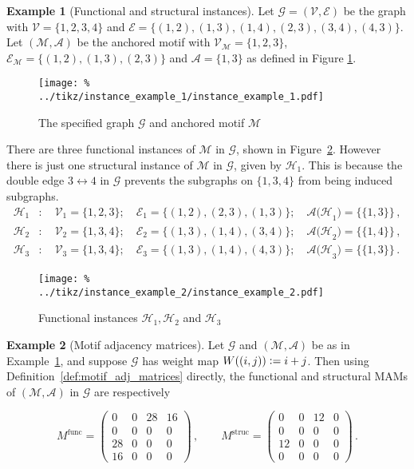 \documentclass[12pt]{ociamthesis}
\theoremstyle{plain}
\theoremstyle{definition}
\newtheorem{example}{Example}[chapter]
\theoremstyle{remark}
\newcommand\ca[1]{\mathcal{#1}}
\begin{document}
\begin{example}[Functional and structural instances]
\label{ex:instances}
Let $\ca{G}=(\ca{V,E})$ be the graph with $\ca{V} = \{ 1,2,3,4 \}$ and
$\ca{E} = \{ (1,2),(1,3),(1,4),(2,3),(3,4),(4,3) \}$. Let $(\ca{M,A})$ be the
anchored motif with $\ca{V_M} = \{1,2,3\}$, $\ca{E_M} =
\{(1,2),(1,3),(2,3)\}$ and $\ca{A} = \{1,3\}$ as defined in Figure
\ref{fig:instance_example_1}.
%
\begin{figure}[H]
\centering
\texttt{[image: \%
../tikz/instance\_example\_1/instance\_example\_1.pdf]}
\caption{The specified graph $\ca{G}$ and anchored motif $\ca{M}$}
\label{fig:instance_example_1}
\end{figure}
%
There are three functional instances of $\ca{M}$ in $\ca{G}$, shown in
Figure~\ref{fig:instance_example_2}. However there is just one structural
instance of $\ca{M}$ in $\ca{G}$, given by $\ca{H}_1$. This is because the
double edge $3 \leftrightarrow 4$ in $\ca{G}$ prevents the subgraphs on
$\{1,3,4\}$ from being induced subgraphs.
%
\begin{align*}
\ca{H}_1 &: \quad \ca{V}_1 = \{ 1,2,3 \} ; \quad \ca{E}_1 = \{ (1,2) ,
(2,3) , (1,3) \} ; \quad \ca{A(H}_1) =  \big\{\{1,3\}\big\}\,, \\
\ca{H}_2 &: \quad \ca{V}_2 = \{ 1,3,4 \} ; \quad \ca{E}_2 = \{ (1,3) ,
(1,4) , (3,4) \} ; \quad \ca{A(H}_2) =  \big\{\{1,4\}\big\}\,, \\
\ca{H}_3 &: \quad \ca{V}_3 = \{ 1,3,4 \} ; \quad \ca{E}_3 = \{ (1,3) ,
(1,4) , (4,3) \} ; \quad \ca{A(H}_3) =  \big\{\{1,3\}\big\}\,.
\end{align*}
%
\begin{figure}[H]
\centering
\texttt{[image: \%
../tikz/instance\_example\_2/instance\_example\_2.pdf]}
\caption{Functional instances $\ca{H}_1,\ca{H}_2$ and $\ca{H}_3$}
\label{fig:instance_example_2}
\end{figure}

\end{example}

\begin{example}[Motif adjacency matrices]
\label{ex:motif_adj_matrices}
Let $\ca{G}$ and $\ca{(M,A)}$ be as in Example~\ref{ex:instances}, and
suppose $\ca{G}$ has weight map $W((i,j)) \vcentcolon = i + j$. Then using
Definition~\ref{def:motif_adj_matrices} directly, the functional and
structural MAMs of $\ca{(M,A)}$ in $\ca{G}$ are respectively

\vspace*{0.2cm}
$$ %
M^\mathrm{func} =
\begin{pmatrix}
0  & 0  & 28 & 16 \\
0  & 0  & 0  & 0  \\
28 & 0  & 0  & 0  \\
16 & 0  & 0  & 0
\end{pmatrix} \,,
\qquad
M^\mathrm{struc} =
\begin{pmatrix}
0  & 0  & 12 & 0  \\
0  & 0  & 0  & 0  \\
12 & 0  & 0  & 0  \\
0  & 0  & 0  & 0
\end{pmatrix}\,.
$$
\end{example}
\end{document}
